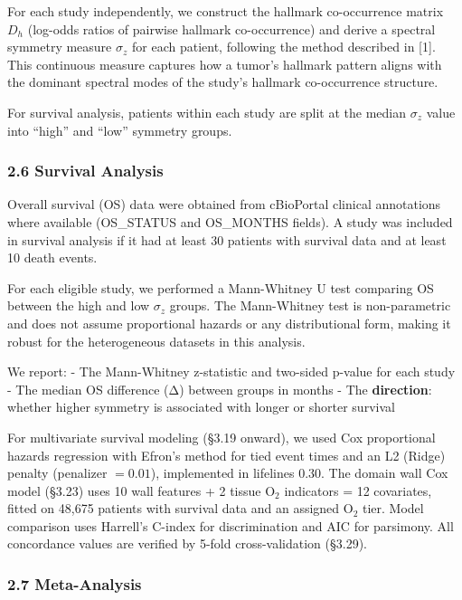 \documentclass[
  11pt,
]{article}
\begin{document}
For each study independently, we construct the hallmark co-occurrence
matrix \(D_h\) (log-odds ratios of pairwise hallmark co-occurrence) and
derive a spectral symmetry measure \(\sigma_z\) for each patient,
following the method described in {[}1{]}. This continuous measure
captures how a tumor's hallmark pattern aligns with the dominant
spectral modes of the study's hallmark co-occurrence structure.

For survival analysis, patients within each study are split at the
median \(\sigma_z\) value into ``high'' and ``low'' symmetry groups.

\subsubsection{2.6 Survival Analysis}\label{survival-analysis}

Overall survival (OS) data were obtained from cBioPortal clinical
annotations where available (OS\_STATUS and OS\_MONTHS fields). A study
was included in survival analysis if it had at least 30 patients with
survival data and at least 10 death events.

For each eligible study, we performed a Mann-Whitney U test comparing OS
between the high and low \(\sigma_z\) groups. The Mann-Whitney test is
non-parametric and does not assume proportional hazards or any
distributional form, making it robust for the heterogeneous datasets in
this analysis.

We report: - The Mann-Whitney z-statistic and two-sided p-value for each
study - The median OS difference (Δ) between groups in months - The
\textbf{direction}: whether higher symmetry is associated with longer or
shorter survival

For multivariate survival modeling (§3.19 onward), we used Cox
proportional hazards regression with Efron's method for tied event times
and an L2 (Ridge) penalty (penalizer \(= 0.01\)), implemented in
lifelines 0.30. The domain wall Cox model (§3.23) uses 10 wall features
+ 2 tissue O\(_2\) indicators = 12 covariates, fitted on 48,675 patients
with survival data and an assigned O\(_2\) tier. Model comparison uses
Harrell's C-index for discrimination and AIC for parsimony. All
concordance values are verified by 5-fold cross-validation (§3.29).

\subsubsection{2.7 Meta-Analysis}\label{meta-analysis}
\end{document}
